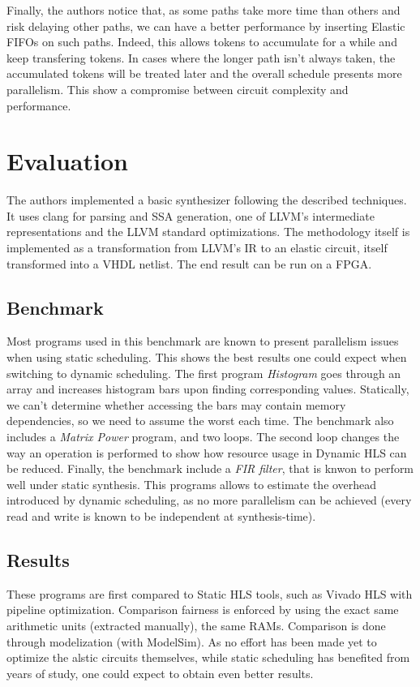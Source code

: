 \documentclass{article}
\begin{document}
Finally, the authors notice that, as some paths take more time than others and risk delaying other paths, we can have a better performance by inserting Elastic FIFOs on such paths. Indeed, this allows tokens to accumulate for a while and keep transfering tokens. In cases where the longer path isn't always taken, the accumulated tokens will be treated later and the overall schedule presents more parallelism. This show a compromise between circuit complexity and performance.


\section{Evaluation}
The authors implemented a basic synthesizer following the described techniques.
It uses clang for parsing and SSA generation, one of LLVM's intermediate representations and the LLVM standard optimizations.
The methodology itself is implemented as a transformation from LLVM's IR to an elastic circuit, itself transformed into a VHDL netlist. The end result can be run on a FPGA.

\subsection{Benchmark}
Most programs used in this benchmark are known to present parallelism issues when using static scheduling. This shows the best results one could expect when switching to dynamic scheduling.
The first program \textit{Histogram} goes through an array and increases histogram bars upon finding corresponding values. Statically, we can't determine whether accessing the bars may contain memory dependencies, so we need to assume the worst each time.
The benchmark also includes a \textit{Matrix Power} program, and two loops. The second loop changes the way an operation is performed to show how resource usage in Dynamic HLS can be reduced.
Finally, the benchmark include a \textit{FIR filter}, that is knwon to perform well under static synthesis. This programs allows to estimate the overhead introduced by dynamic scheduling, as no more parallelism can be achieved (every read and write is known to be independent at synthesis-time).

\subsection{Results}
These programs are first compared to Static HLS tools, such as Vivado HLS with pipeline optimization. Comparison fairness is enforced by using the exact same arithmetic units (extracted manually), the same RAMs.
Comparison is done through modelization (with ModelSim).
As no effort has been made yet to optimize the alstic circuits themselves, while static scheduling has benefited from years of study, one could expect to obtain even better results.
\end{document}

